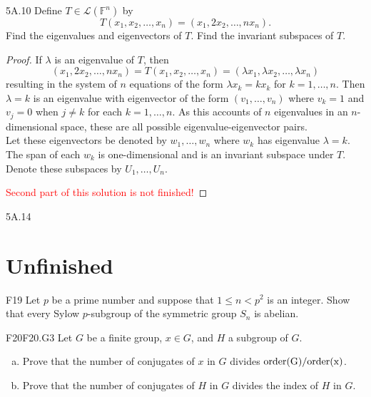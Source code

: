 \documentclass{article}
\newcommand{\F}{\mathbb{F}}
\newcommand{\scr}{\mathscr}
\theoremstyle{definition}
\begin{document}
\begin{LA}{5A.10}{}
Define $T \in \scr{L}(\F^n)$ by
	\[T(x_1, x_2, \ldots, x_n) = (x_1, 2x_2, \ldots, n x_n). \]
Find the eigenvalues and eigenvectors of $T$. Find the invariant subspaces of $T$.
\end{LA}

\begin{proof}
If $\lambda$ is an eigenvalue of $T$, then
	\[(x_1, 2x_2, \ldots, n x_n) = T(x_1, x_2, \ldots, x_n) = (\lambda x_1, \lambda x_2, \ldots, \lambda x_n) \]
resulting in the system of $n$ equations of the form $\lambda x_k = k x_k$ for $k = 1, \ldots, n$. Then $\lambda = k$ is an eigenvalue with eigenvector of the form $(v_1, \ldots, v_n)$ where $v_k = 1$ and $v_j = 0$ when $j \neq k$ for each $k = 1, \ldots, n$. As this accounts of $n$ eigenvalues in an $n$-dimensional space, these are all possible eigenvalue-eigenvector pairs.\\

Let these eigenvectors be denoted by $w_1, \ldots, w_n$ where $w_k$ has eigenvalue $\lambda = k$. The span of each $w_k$ is one-dimensional and is an invariant subspace under $T$. Denote these subspaces by $U_1, \ldots, U_n$.

\textcolor{red}{Second part of this solution is not finished!}
\end{proof}

\begin{LA}{5A.14}{}
\end{LA}

\section{Unfinished}

	\begin{prob}{F19}{}
	Let $p$ be a prime number and suppose that $1 \leq n <p^2$ is an integer. Show that every Sylow $p$-subgroup of the symmetric group $S_n$ is abelian.
	\end{prob}
	

	\begin{prob}{F20}{F20.G3}
	Let $G$ be a finite group, $x \in G$, and $H$ a subgroup of $G$.
	\begin{enumerate}[(a)]
	\item Prove that the number of conjugates of $x$ in $G$ divides $\rm{order}(G)/\rm{order}(x)$.
	\item Prove that the number of conjugates of $H$ in $G$ divides the index of $H$ in $G$.
	\end{enumerate}
	\end{prob}
\end{document}
